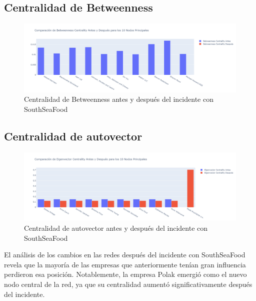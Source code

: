 \documentclass[11pt,spanish,a4paper]{article}
\begin{document}
\subsection{Centralidad de Betweenness}

\begin{figure}[H]
    \centering
    \includegraphics[width=0.8\linewidth]{graphs/betweeness_centrality_after_before_southseafood_top10.png}
    \caption{Centralidad de Betweenness antes y después del incidente con SouthSeaFood}
    \label{fig:cent_Betweenness}
\end{figure}

\subsection{Centralidad de autovector}

\begin{figure}[H]
    \centering
    \includegraphics[width=0.8\linewidth]{graphs/eingenvector_centrality_after_before_southseafood_top10.png}
    \caption{Centralidad de autovector antes y después del incidente con SouthSeaFood}
    \label{fig:cent_autovector}
\end{figure}

El análisis de los cambios en las redes después del incidente con SouthSeaFood revela que la mayoría de las empresas que anteriormente tenían gran influencia perdieron esa posición. Notablemente, la empresa Polak emergió como el nuevo nodo central de la red, ya que su centralidad aumentó significativamente después del incidente.

\printbibliography[heading=bibintoc] %
\end{document}
